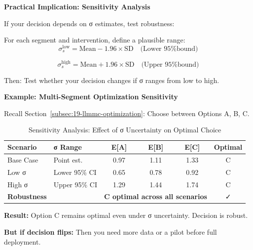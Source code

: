 \textbf{Practical Implication: Sensitivity Analysis}

If your decision depends on σ estimates, test robustness:

\begin{definition}
\label{def:19-sensitivity}

For each segment and intervention, define a plausible range:
\begin{equation}
\sigma_s^{\text{low}} = \text{Mean} - 1.96 \times \text{SD}
\quad \text{(Lower 95\% bound)}
\end{equation}

\begin{equation}
\sigma_s^{\text{high}} = \text{Mean} + 1.96 \times \text{SD}
\quad \text{(Upper 95\% bound)}
\end{equation}

Then: Test whether your decision changes if σ ranges from low to high.

\end{definition}

\textbf{Example: Multi-Segment Optimization Sensitivity}

Recall Section~\ref{subsec:19-llmmc-optimization}: Choose between Options A, B, C.

\begin{table}[htbp]
\centering
\caption{Sensitivity Analysis: Effect of σ Uncertainty on Optimal Choice}
\label{tab:19-sensitivity-example}
\renewcommand{\arraystretch}{1.3}
\small
\begin{tabular}{@{}llcccc@{}}
\toprule
\textbf{Scenario} & \textbf{σ Range} & \textbf{E[A]} & \textbf{E[B]} & \textbf{E[C]} & \textbf{Optimal} \\
\midrule
Base Case & Point est. & 0.97 & 1.11 & 1.33 & C \\
Low σ & Lower 95\% CI & 0.65 & 0.78 & 0.92 & C \\
High σ & Upper 95\% CI & 1.29 & 1.44 & 1.74 & C \\
\midrule
\textbf{Robustness} & & \multicolumn{3}{c}{\textbf{C optimal across all scenarios}} & ✓ \\
\bottomrule
\end{tabular}
\end{table}

\textbf{Result:} Option C remains optimal even under σ uncertainty. Decision is robust.

\textbf{But if decision flips:} Then you need more data or a pilot before full deployment.

